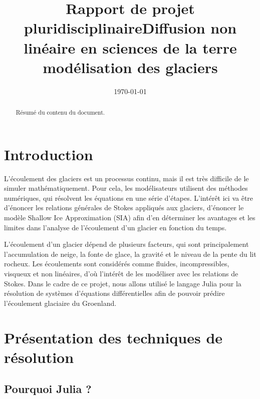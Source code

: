 \documentclass{article}
\begin{document}
\title{Rapport de projet pluridisciplinaire}

\date{\today}
        
\newpage

\title{Diffusion non linéaire en sciences de la terre modélisation des glaciers}
 
\maketitle
\tableofcontents

\begin{abstract}
Résumé du contenu du document.
\end{abstract}

\newpage
\section{Introduction}\label{sec:intro}

L’écoulement des glaciers est un processus continu, mais il est très difficile de le simuler mathématiquement. Pour cela, les modélisateurs utilisent des méthodes numériques, qui résolvent les équations en une série d’étapes.
L’intérêt ici va être d’énoncer les relations générales de Stokes appliqués aux glaciers, d’énoncer le modèle Shallow Ice Approximation (SIA) afin d’en déterminer les avantages et les limites dans l’analyse de l’écoulement d’un glacier en fonction du temps.

L’écoulement d’un glacier dépend de plusieurs facteurs, qui sont principalement l’accumulation de neige, la fonte de glace, la gravité et le niveau de la pente du lit rocheux.
Les écoulements sont considérés comme fluides, incompressibles, visqueux et non linéaires, d’où l’intérêt de les modéliser avec les relations de Stokes.
Dans le cadre de ce projet, nous allons utilisé le langage Julia pour la résolution de systèmes d'équations différentielles afin de pouvoir prédire l'écoulement glaciaire du Groenland.


\section{Présentation des techniques de résolution}

\subsection{Pourquoi Julia ?}
\end{document}
